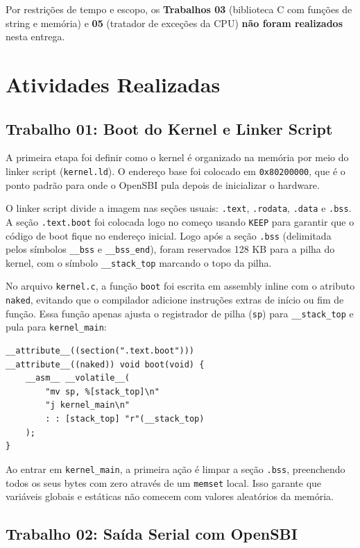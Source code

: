 \documentclass[12pt]{article}
\begin{document}
Por restrições de tempo e escopo, os \textbf{Trabalhos 03} (biblioteca C com funções de string e memória) e \textbf{05} (tratador de exceções da CPU) \textbf{não foram realizados} nesta entrega.

\section{Atividades Realizadas}

\subsection{Trabalho 01: Boot do Kernel e Linker Script}

A primeira etapa foi definir como o kernel é organizado na memória por meio do linker script (\texttt{kernel.ld}). O endereço base foi colocado em \texttt{0x80200000}, que é o ponto padrão para onde o OpenSBI pula depois de inicializar o hardware.

O linker script divide a imagem nas seções usuais: \texttt{.text}, \texttt{.rodata}, \texttt{.data} e \texttt{.bss}. A seção \texttt{.text.boot} foi colocada logo no começo usando \texttt{KEEP} para garantir que o código de boot fique no endereço inicial. Logo após a seção \texttt{.bss} (delimitada pelos símbolos \texttt{\_\_bss} e \texttt{\_\_bss\_end}), foram reservados 128 KB para a pilha do kernel, com o símbolo \texttt{\_\_stack\_top} marcando o topo da pilha.

No arquivo \texttt{kernel.c}, a função \texttt{boot} foi escrita em assembly inline com o atributo \texttt{naked}, evitando que o compilador adicione instruções extras de início ou fim de função. Essa função apenas ajusta o registrador de pilha (\texttt{sp}) para \texttt{\_\_stack\_top} e pula para \texttt{kernel\_main}:

\begin{verbatim}
__attribute__((section(".text.boot")))
__attribute__((naked)) void boot(void) {
    __asm__ __volatile__(
        "mv sp, %[stack_top]\n"
        "j kernel_main\n"
        : : [stack_top] "r"(__stack_top)
    );
}
\end{verbatim}

Ao entrar em \texttt{kernel\_main}, a primeira ação é limpar a seção \texttt{.bss}, preenchendo todos os seus bytes com zero através de um \texttt{memset} local. Isso garante que variáveis globais e estáticas não comecem com valores aleatórios da memória.

\subsection{Trabalho 02: Saída Serial com OpenSBI}
\end{document}
